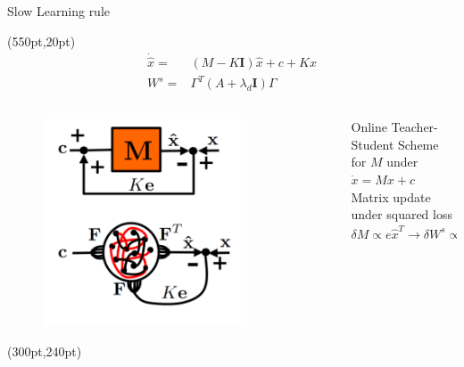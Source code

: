 \documentclass[17pt, t, lualatex]{beamer}
\begin{document}
\begin{frame}{Slow Learning rule}


	\begin{textblock*}{10pt}(550pt,20pt)
		\small
		\begin{equation*}
		\begin{aligned}
			\dot{\hat{x}}=&(M-K \mathbf{I}) \hat{x}+c+K x\\
			W^s =& \Gamma^T\left(A + \lambda_d\mathbf{I}\right)\Gamma
		\end{aligned}
		\end{equation*}
	\end{textblock*}

	\begin{columns}
		\begin{column}{0.45\textwidth}
			\begin{figure}
				\centering
				\includegraphics[width = 0.8\textwidth,trim= 0cm 0cm 0cm 8cm]{figures/slow_learning_rule.png}
			\end{figure}
			\begin{textblock*}{10pt}(300pt,240pt)
				\small
				\cite{bourdoukan_enforcing_2015}
			\end{textblock*}
		\end{column}
		\begin{column}{0.45\textwidth}
			Online Teacher-Student Scheme for $M$ under $\dot{x} = Mx +c$\\
			Matrix update under squared loss
			\begin{equation}
				\delta M \propto e\hat{x}^T \longrightarrow\delta W^s \propto \Gamma \left(e\hat{x}^T\right)\Gamma^T \approx \Gamma er
			\end{equation}
		\end{column}
	\end{columns}
\end{frame}
\end{document}
